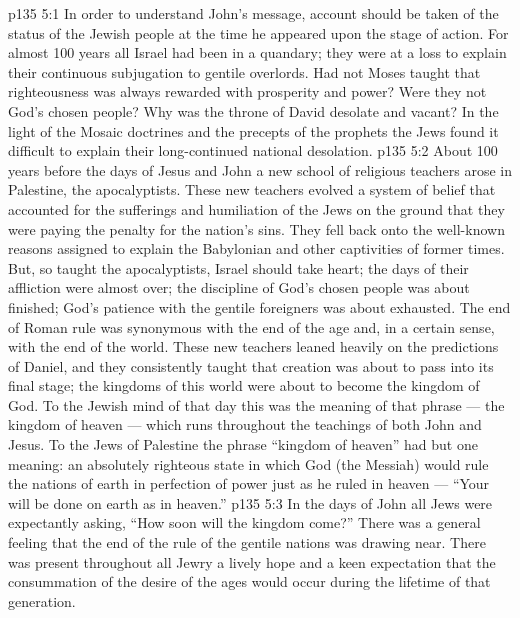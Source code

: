 \vs p135 5:1 In order to understand John’s message, account should be taken of the status of the Jewish people at the time he appeared upon the stage of action. For almost 100 years all Israel had been in a quandary; they were at a loss to explain their continuous subjugation to gentile overlords. Had not Moses taught that righteousness was always rewarded with prosperity and power? Were they not God’s chosen people? Why was the throne of David desolate and vacant? In the light of the Mosaic doctrines and the precepts of the prophets the Jews found it difficult to explain their long\hyp{}continued national desolation.
\vs p135 5:2 About 100 years before the days of Jesus and John a new school of religious teachers arose in Palestine, the apocalyptists. These new teachers evolved a system of belief that accounted for the sufferings and humiliation of the Jews on the ground that they were paying the penalty for the nation’s sins. They fell back onto the well\hyp{}known reasons assigned to explain the Babylonian and other captivities of former times. But, so taught the apocalyptists, Israel should take heart; the days of their affliction were almost over; the discipline of God’s chosen people was about finished; God’s patience with the gentile foreigners was about exhausted. The end of Roman rule was synonymous with the end of the age and, in a certain sense, with the end of the world. These new teachers leaned heavily on the predictions of Daniel, and they consistently taught that creation was about to pass into its final stage; the kingdoms of this world were about to become the kingdom of God. To the Jewish mind of that day this was the meaning of that phrase --- the kingdom of heaven --- which runs throughout the teachings of both John and Jesus. To the Jews of Palestine the phrase “kingdom of heaven” had but one meaning: an absolutely righteous state in which God (the Messiah) would rule the nations of earth in perfection of power just as he ruled in heaven --- “Your will be done on earth as in heaven.”
\vs p135 5:3 In the days of John all Jews were expectantly asking, “How soon will the kingdom come?” There was a general feeling that the end of the rule of the gentile nations was drawing near. There was present throughout all Jewry a lively hope and a keen expectation that the consummation of the desire of the ages would occur during the lifetime of that generation.
